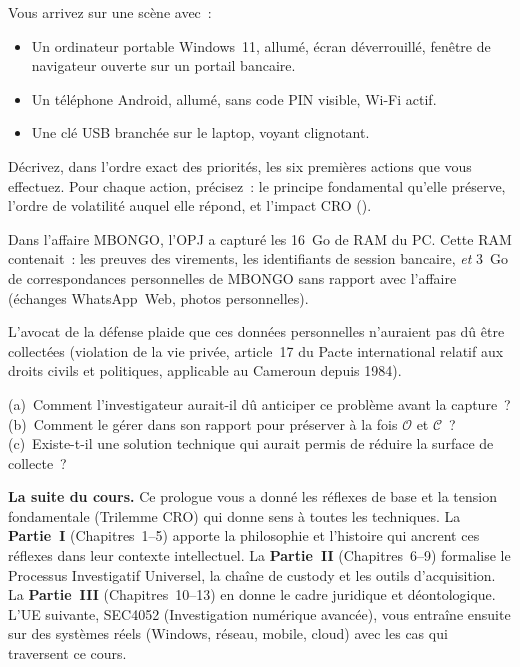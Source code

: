 \begin{boxexo}[title={\ding{45}\quad Exercice P.2. Scénario de triage \niveaumoyen}]
Vous arrivez sur une scène avec~:
\begin{itemize}
    \item Un ordinateur portable Windows~11, allumé, écran déverrouillé,
          fenêtre de navigateur ouverte sur un portail bancaire.
    \item Un téléphone Android, allumé, sans code PIN visible, Wi-Fi actif.
    \item Une clé USB branchée sur le laptop, voyant clignotant.
\end{itemize}
Décrivez, dans l'ordre exact des priorités, les six premières actions que
vous effectuez. Pour chaque action, précisez~: le principe fondamental
qu'elle préserve, l'ordre de volatilité auquel elle répond, et l'impact
CRO ().
\end{boxexo}

\begin{boxexo}[title={\ding{45}\quad Exercice P.3. Réflexion CRO \niveauexpert}]
Dans l'affaire MBONGO, l'OPJ a capturé les 16~Go de RAM du PC. Cette RAM
contenait~: les preuves des virements, les identifiants de session bancaire,
\emph{et} 3~Go de correspondances personnelles de MBONGO sans rapport avec
l'affaire (échanges WhatsApp~Web, photos personnelles).

L'avocat de la défense plaide que ces données personnelles n'auraient pas
dû être collectées (violation de la vie privée, article~17 du Pacte
international relatif aux droits civils et politiques, applicable au
Cameroun depuis 1984).

\smallskip
(a)~Comment l'investigateur aurait-il dû anticiper ce problème avant
la capture~?\\
(b)~Comment le gérer dans son rapport pour préserver à la fois
$\mathcal{O}$ et $\mathcal{C}$~?\\
(c)~Existe-t-il une solution technique qui aurait permis de réduire
la surface de collecte~?
\end{boxexo}

\bigskip

\begin{boxinfo}
\textbf{La suite du cours.} Ce prologue vous a donné les réflexes de base
et la tension fondamentale (Trilemme CRO) qui donne sens à toutes les
techniques. La \textbf{Partie~I} (Chapitres~1--5) apporte la philosophie
et l'histoire qui ancrent ces réflexes dans leur contexte intellectuel.
La \textbf{Partie~II} (Chapitres~6--9) formalise le Processus Investigatif
Universel, la chaîne de custody et les outils d'acquisition. La
\textbf{Partie~III} (Chapitres~10--13) en donne le cadre juridique et déontologique. L'UE suivante, SEC4052 (Investigation numérique avancée), vous entraîne ensuite sur des systèmes réels (Windows, réseau, mobile, cloud) avec les cas qui traversent ce cours.
\end{boxinfo}
